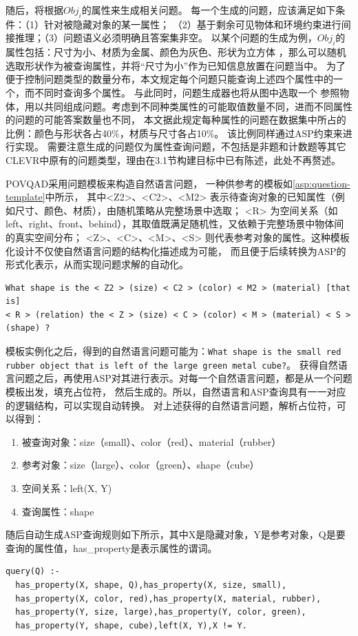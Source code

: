 随后，将根据$Obj_i$的属性来生成相关问题。
每一个生成的问题，应该满足如下条件：（1）针对被隐藏对象的某一属性；
（2）基于剩余可见物体和环境约束进行间接推理；（3）问题语义必须明确且答案集非空。
以某个问题的生成为例，$Obj_i$的属性包括：尺寸为小、材质为金属、颜色为灰色、形状为立方体
，那么可以随机选取形状作为被查询属性，并将“尺寸为小”作为已知信息放置在问题当中。
为了便于控制问题类型的数量分布，本文规定每个问题只能查询上述四个属性中的一个，而不同时查询多个属性。
与此同时，问题生成器也将从图中选取一个
参照物体，用以共同组成问题。考虑到不同种类属性的可能取值数量不同，进而不同属性的问题的可能答案数量也不同，
本文据此规定每种属性的问题在数据集中所占的比例：颜色与形状各占40\%，材质与尺寸各占10\%。
该比例同样通过ASP约束来进行实现。
需要注意生成的问题仅为属性查询问题，不包括是非题和计数题等其它CLEVR中原有的问题类型，理由在3.1节构建目标中已有陈述，此处不再赘述。

POVQAD采用问题模板来构造自然语言问题，
一种供参考的模板如\ref{asp:question-template}中所示，
其中<Z2>、<C2>、<M2> 表示待查询对象的已知属性（例如尺寸、颜色、材质），由随机策略从完整场景中选取；
<R> 为空间关系（如left、right、front、behind），其取值既满足随机性，又依赖于完整场景中物体间的真实空间分布；
<Z>、<C>、<M>、<S> 则代表参考对象的属性。这种模板化设计不仅使自然语言问题的结构化描述成为可能，
而且便于后续转换为ASP的形式化表示，从而实现问题求解的自动化。
\begin{lstlisting}[label=asp:question-template]
What shape is the < Z2 > (size) < C2 > (color) < M2 > (material) [that is] 
< R > (relation) the < Z > (size) < C > (color) < M > (material) < S > (shape) ?
\end{lstlisting}

模板实例化之后，得到的自然语言问题可能为：\texttt{What shape is the small red rubber object that is left of the large green metal cube?}。
获得自然语言问题之后，再使用ASP对其进行表示。对每一个自然语言问题，都是从一个问题模板出发，填充占位符，
然后生成的。所以，自然语言和ASP查询具有一一对应的逻辑结构，可以实现自动转换。
对上述获得的自然语言问题，解析占位符，可以得到：
\begin{enumerate}[nosep]
\item 被查询对象：size（small）、color（red）、material（rubber）
\item 参考对象：size（large）、color（green）、shape（cube）
\item 空间关系：left(X, Y)
\item 查询属性：shape
\end{enumerate}

随后自动生成ASP查询规则如下所示，其中X是隐藏对象，Y是参考对象，Q是要查询的属性值，has\_property是表示属性的谓词。
\begin{lstlisting}
query(Q) :-
  has_property(X, shape, Q),has_property(X, size, small),
  has_property(X, color, red),has_property(X, material, rubber),
  has_property(Y, size, large),has_property(Y, color, green),
  has_property(Y, shape, cube),left(X, Y),X != Y.
\end{lstlisting}
